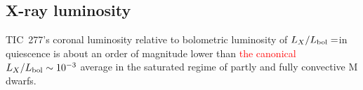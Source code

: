 \documentclass[twocolumn]{aastex631}
\begin{document}
\subsection{X-ray luminosity}
\label{sec:discussion:xraylum}


TIC~277's coronal luminosity relative to bolometric luminosity of $L_X/L_{\rm bol}=$\LXLbol in quiescence is about an order of magnitude lower than \textcolor{red}{the canonical} $L_X/L_{\rm bol}\sim 10^{-3}$ average in the saturated regime of partly and fully convective M dwarfs\citep{wright2011stellaractivityrotation,wright2016solartype,wright2018stellar}.%
\end{document}
